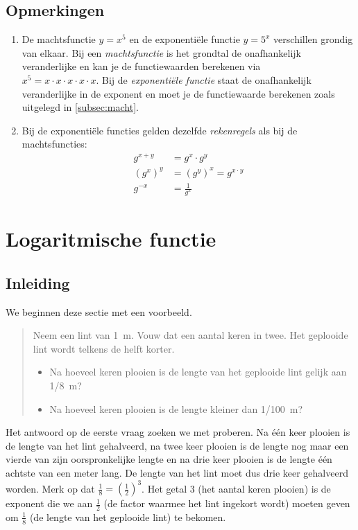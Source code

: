  \subsection{Opmerkingen}
 \begin{enumerate}
     \item  De machtsfunctie $y=x^{5}$ en de exponenti\"{e}le functie
     $y=5^{x}$ verschillen grondig van elkaar. Bij een \emph{machtsfunctie}
     is het grondtal de onafhankelijk veranderlijke en kan je de
     functiewaarden berekenen via \\$x^{5}=x\cdot x\cdot x\cdot x\cdot x$. Bij de
     \emph{exponenti\"{e}le functie} staat de onafhankelijk veranderlijke in
     de exponent en moet je de functiewaarde berekenen zoals uitgelegd in \cref{subsec:macht}.

     \item  Bij de exponenti\"{e}le functies gelden dezelfde
     \emph{rekenregels} als bij de machtsfuncties:
     \begin{align*}
       g^{x+y} & =g^{x}\cdot g^{y} \\
       \left(g^{x}\right)^{y} & =\left(g^{y}\right)^{x}=g^{x\cdot y} \\
       g^{-x} & =\frac{1}{g^{x}}
     \end{align*}
 \end{enumerate}



\section{Logaritmische functie}
\subsection{Inleiding}
We beginnen deze sectie met een voorbeeld. 
\begin{quote}
Neem een lint van \SI{1}{\meter}. Vouw dat een aantal keren in twee. Het geplooide
lint wordt telkens de helft korter.
\begin{itemize}
    \item  Na hoeveel keren plooien is de lengte van het geplooide lint gelijk aan \SI{1/8}{\meter}?

    \item  Na hoeveel keren plooien is de lengte kleiner dan \SI{1/100}{\meter}?
\end{itemize}
\end{quote}
Het antwoord op de eerste vraag zoeken we met proberen. Na \'e\'en keer plooien is de lengte van het lint gehalveerd, na twee keer plooien is de lengte nog maar een vierde van zijn oorspronkelijke lengte en na drie keer plooien is de lengte \'e\'en achtste van een meter lang. De lengte van het lint moet dus drie keer gehalveerd worden.  Merk op dat  $\frac18=\left(\frac12\right)^3$. Het getal 3 (het aantal keren plooien) is de exponent die we aan $\frac12$ (de factor waarmee het lint ingekort wordt) moeten geven om $\frac18$ (de lengte van het geplooide lint) te bekomen.


